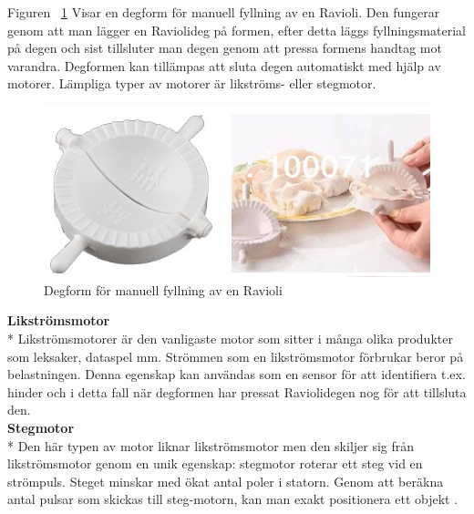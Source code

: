Figuren ~\ref{degform} Visar en degform för manuell fyllning av en Ravioli. Den fungerar genom att man lägger en Raviolideg på formen, efter detta läggs fyllningsmaterial på degen och sist tillsluter man degen genom att pressa formens handtag mot varandra. Degformen kan tillämpas att sluta degen automatiskt med hjälp av motorer. Lämpliga typer av motorer  är likströms- eller stegmotor.
\begin{figure}[h]
	\begin{center}
		\includegraphics[scale=0.75]{images/ravioli_mould_trimed_1.jpg}
		\caption{Degform för manuell fyllning av en Ravioli}
		\label{degform}
	\end{center}
\end{figure}
\textbf{Likströmsmotor}\\*
Likströmsmotorer är den vanligaste motor som sitter i många olika produkter som leksaker, dataspel mm\cite{likstromsmotor}. Strömmen som en likströmsmotor förbrukar beror på belastningen. Denna egenskap kan användas som en sensor för att identifiera t.ex. hinder och i detta fall när degformen har pressat Raviolidegen nog för att tillsluta den.\\

\textbf{Stegmotor}\\*
Den här typen av motor liknar likströmsmotor men den skiljer sig från likströmsmotor genom en unik egenskap: stegmotor roterar ett steg vid en strömpuls. Steget minskar med ökat antal poler i statorn. Genom att beräkna antal pulsar som skickas till steg-motorn, kan man exakt positionera ett objekt \cite{stegmotor}.
